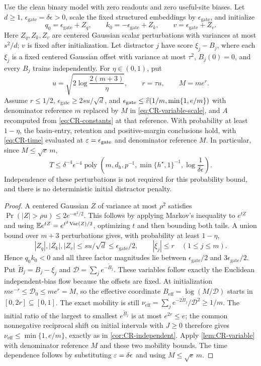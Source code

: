 \begin{corollary}
\label{cor:CR-scalar-Gaussian}
Use the clean binary model with zero readouts and zero useful-site biases.
Let $d\ge1$, $\epsilon_{\mathrm{gate}}=\delta\epsilon>0$, scale the fixed structured embeddings by $\epsilon_{\mathrm{gate}}$, and initialize
\[
 q_0=\epsilon_{\mathrm{gate}}+Z_q,\qquad
 k_0=-\epsilon_{\mathrm{gate}}+Z_k,\qquad
 v=\epsilon_{\mathrm{gate}}+Z_v.
\]
Here $Z_q,Z_k,Z_v$ are centered Gaussian scalar perturbations with variances at most $s^2/d$;
$v$ is fixed after initialization. Let distractor $j$ have score $\xi_j-B_j$, where each $\xi_j$ is a fixed centered Gaussian offset
with variance at most $\tau^2$, $B_j(0)=0$, and every $B_j$ trains independently.
For $\eta\in(0,1)$, put
\[
 u=\sqrt{2\log\frac{2(m+3)}\eta},\qquad r=\tau u,\qquad M=me^r.
\]
Assume $r\le1/2$, $\epsilon_{\mathrm{gate}}\ge2su/\sqrt d$, and
$\epsilon_{\mathrm{gate}}\le\widehat{\varepsilon}(1/m,\min\{1,e/m\})$ with denominator reference $m$ replaced by $M$ in
\cref{eq:CR-variable-scale}, and $A$ recomputed from \cref{eq:CR-constants} at that reference.
With probability at least $1-\eta$, the basin-entry, retention and positive-margin conclusions hold,
with \cref{eq:CR-time} evaluated at $\varepsilon=\epsilon_{\mathrm{gate}}$ and denominator reference $M$.
In particular, since $M\le\sqrt e\,m$,
\[
 T\le\delta^{-4}\epsilon^{-4}\operatorname{poly}\!\left(m,d_{\mathrm h},p^{-1},\min\{h^\star,1\}^{-1},
 \log\frac1{\delta\epsilon}\right).
\]
Independence of these perturbations is not required for this probability bound, and there is no deterministic initial distractor penalty.
\end{corollary}
\begin{proof}
A centered Gaussian $Z$ of variance at most $\rho^2$ satisfies
$\Pr(|Z|>\rho u)\le2e^{-u^2/2}$.
This follows by applying Markov's inequality to $e^{tZ}$ and using $\mathbb E e^{tZ}=e^{t^2\operatorname{Var}(Z)/2}$,
optimizing $t$ and then bounding both tails.
A union bound over $m+3$ perturbations gives, with probability at least $1-\eta$,
\[
 |Z_q|,|Z_k|,|Z_v|\le su/\sqrt d\le\epsilon_{\mathrm{gate}}/2,
 \qquad |\xi_j|\le r\quad(1\le j\le m).
\]
Hence $q_0k_0<0$ and all three factor magnitudes lie between $\epsilon_{\mathrm{gate}}/2$ and $3\epsilon_{\mathrm{gate}}/2$.
Put $\widetilde B_j=B_j-\xi_j$ and $\mathcal D=\sum_je^{-\widetilde B_j}$.
These variables follow exactly the Euclidean independent-bias flow because the offsets are fixed.
At initialization $me^{-r}\le \mathcal D_0\le me^r=M$, so the effective coordinate
$B_{\mathrm{eff}}=\log(M/\mathcal D)$ starts in $[0,2r]\subseteq[0,1]$.
The exact mobility is still $\nu_{\mathrm{eff}}=\sum_je^{-2\widetilde B_j}/\mathcal D^2\ge1/m$.
The initial ratio of the largest to smallest $e^{\widetilde B_j}$ is at most $e^{2r}\le e$;
the common nonnegative reciprocal shift on initial intervals with $J\ge0$ therefore gives
$\nu_{\mathrm{eff}}\le\min\{1,e/m\}$, exactly as in \cref{cor:CR-independent}.
Apply \cref{lem:CR-variable} with denominator reference $M$ and these two mobility bounds.
The time dependence follows by substituting $\varepsilon=\delta\epsilon$ and using $M\le\sqrt e\,m$.
\end{proof}
